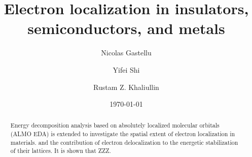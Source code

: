 \documentclass[aps,prb,twocolumn,amsmath,amssymb,superscriptaddress,longbibliography]{revtex4-1}
\begin{document}
\title{
Electron localization in insulators, semiconductors, and metals
}

\author{Nicolas Gastellu}
\author{Yifei Shi}
\author{Rustam Z. Khaliullin}

\date{\today}

\begin{abstract}
Energy decomposition analysis based on absolutely localized molecular orbitals (ALMO EDA) is extended to investigate the spatial extent of electron localization in materials.  and the contribution of electron delocalization to the energetic stabilization of their lattices. It is shown that ZZZ.
\end{abstract}

\maketitle
 
%
%
\end{document}
